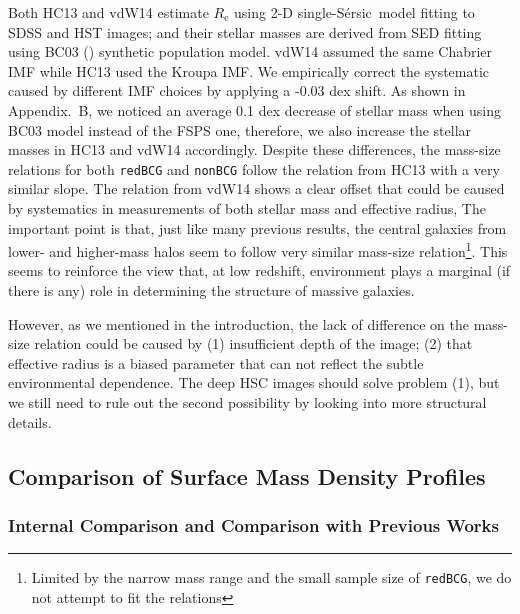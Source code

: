 \documentclass[preprint]{aastex}
\def\ser{{S\'{e}rsic\ }}
\begin{document}
\begin{CJK*}{UTF8}{gbsn}
    Both HC13 and vdW14 estimate $R_{\mathrm{e}}$ using 2-D single-\ser model 
    fitting to SDSS and HST images; and their stellar masses are derived from 
    SED fitting using BC03 (\citealt{BC03}) synthetic population model. 
    vdW14 assumed the same Chabrier IMF while HC13 used the Kroupa IMF. 
    We empirically correct the systematic caused by different IMF choices by 
    applying a -0.03 dex shift.  
    As shown in Appendix.~B, we noticed an average 0.1 dex decrease of stellar 
    mass when using BC03 model instead of the FSPS one, therefore, we also 
    increase the stellar masses in HC13 and vdW14 accordingly. 
    Despite these differences, the mass-size relations for both \texttt{redBCG} 
    and \texttt{nonBCG} follow the relation from HC13 with a very similar 
    slope.
    The relation from vdW14 shows a clear offset that could be caused by 
    systematics in measurements of both stellar mass and effective radius, 
    The important point is that, just like many previous results, the central 
    galaxies from lower- and higher-mass halos seem to follow very similar 
    mass-size relation\footnote{Limited by the narrow mass range and the small
    sample size of \texttt{redBCG}, we do not attempt to fit the relations}.  
    This seems to reinforce the view that, at low redshift, environment 
    plays a marginal (if there is any) role in determining the structure
    of massive galaxies.  
    
    However, as we mentioned in the introduction, the lack of difference on
    the mass-size relation could be caused by 
    (1) insufficient depth of the image; 
    (2) that effective radius is a biased parameter that can not reflect the 
    subtle environmental dependence.  
    The deep HSC images should solve problem (1), but we still need to 
    rule out the second possibility by looking into more structural details. 
    
\subsection{Comparison of Surface Mass Density Profiles}

\subsubsection{Internal Comparison and Comparison with Previous Works}
    

\end{CJK*}
\end{document}
